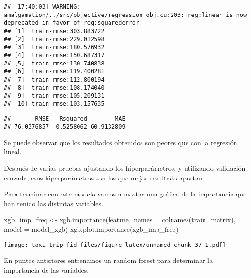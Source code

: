 \documentclass[
]{article}
\newenvironment{Shaded}{\begin{snugshade}}{\end{snugshade}}
\newcommand{\AttributeTok}[1]{\textcolor[rgb]{0.77,0.63,0.00}{#1}}
\newcommand{\FunctionTok}[1]{\textcolor[rgb]{0.00,0.00,0.00}{#1}}
\newcommand{\NormalTok}[1]{#1}
\newcommand{\OtherTok}[1]{\textcolor[rgb]{0.56,0.35,0.01}{#1}}
\newcommand{\SpecialCharTok}[1]{\textcolor[rgb]{0.00,0.00,0.00}{#1}}
\begin{document}
\begin{verbatim}
## [17:40:03] WARNING: amalgamation/../src/objective/regression_obj.cu:203: reg:linear is now deprecated in favor of reg:squarederror.
## [1]  train-rmse:303.883722 
## [2]  train-rmse:229.012598 
## [3]  train-rmse:180.576932 
## [4]  train-rmse:150.687317 
## [5]  train-rmse:130.740838 
## [6]  train-rmse:119.400281 
## [7]  train-rmse:112.800194 
## [8]  train-rmse:108.174040 
## [9]  train-rmse:105.209131 
## [10] train-rmse:103.157635
\end{verbatim}

\begin{Shaded}
\end{Shaded}

\begin{verbatim}
##       RMSE   Rsquared        MAE 
## 76.0376857  0.5258062 60.9132809
\end{verbatim}

Se puede observar que los resultados obtenidos son peores que con la
regresión lineal.

Después de varias pruebas ajustando los hiperparámetros, y utilizando
validación cruzada, esos hiperparámetros son los que mejor resultado
aportan.

Para terminar con este modelo vamos a mostar una gráfica de la
importancia que han tenido las distintas variables.

\begin{Shaded}
\begin{Highlighting}[]
\NormalTok{xgb\_imp\_freq }\OtherTok{\textless{}{-}} \FunctionTok{xgb.importance}\NormalTok{(}\AttributeTok{feature\_names =} \FunctionTok{colnames}\NormalTok{(train\_matrix), }
                               \AttributeTok{model =}\NormalTok{ model\_xgb)}
\FunctionTok{xgb.plot.importance}\NormalTok{(xgb\_imp\_freq)}
\end{Highlighting}
\end{Shaded}

\texttt{[image: taxi\_trip\_fid\_files/figure-latex/unnamed-chunk-37-1.pdf]}

En puntos anteriores entrenamos un random forest para determinar la
importancia de las variables.
\end{document}
